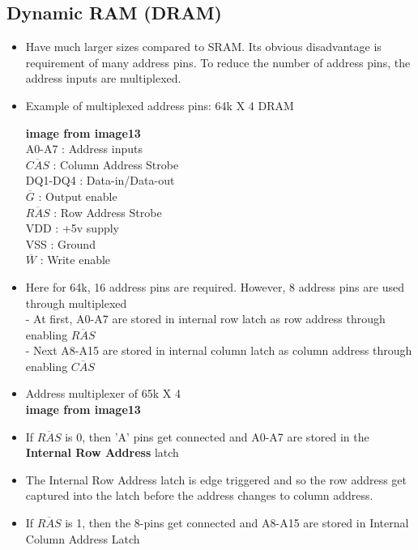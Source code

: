 \documentclass[12pt]{article}
\begin{document}
\subsection{Dynamic RAM (DRAM)}
\begin{itemize}
	\item Have much larger sizes compared to SRAM. Its obvious disadvantage is requirement of many address pins. To reduce the number of address pins, the address inputs are multiplexed.
	
	\item Example of multiplexed address pins: 64k X 4 DRAM
	
	\textbf{image from image13}\\
	
	A0-A7 : Address inputs\\
	$\overline{CAS}$ : Column Address Strobe\\
	DQ1-DQ4 : Data-in/Data-out\\
	$\overline{G}$ : Output enable\\
	$\overline{RAS}$ : Row Address Strobe\\
	VDD : +5v supply\\
	VSS : Ground\\
	$\overline{W}$ : Write enable
	
	\item Here for 64k, 16 address pins are required. However, 8 address pins are used through multiplexed\\
	 
	- At first, A0-A7 are stored in internal row latch as row address through  enabling $\overline{RAS}$\\
	- Next A8-A15 are stored in internal column latch as column address through enabling $\overline{CAS}$
	
	\item Address multiplexer of 65k X 4\\
	\textbf{image from image13}\\
	
	\item If $\overline{RAS}$ is 0, then 'A' pins get connected and A0-A7 are stored in the \textbf{Internal Row Address} latch
	
	\item The Internal Row Address latch is edge triggered and so the row address get captured into the latch before the address changes to column address.
	
	\item If $\overline{RAS}$ is 1, then the 8-pins get connected and A8-A15 are stored in Internal Column Address Latch  
\end{itemize}
\end{document}
